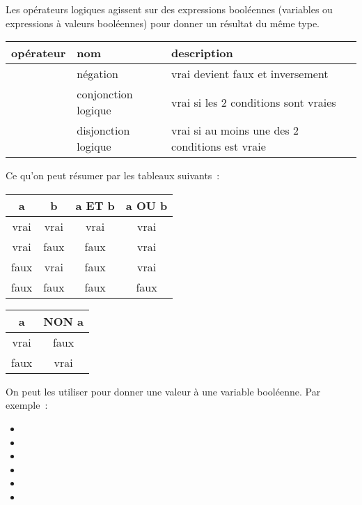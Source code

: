 			Les opérateurs logiques agissent sur des expressions booléennes 
			(variables ou expressions à valeurs booléennes) 
			pour donner un résultat du même type.
	
			\begin{center}
			\begin{tabular}{m{15mm}|m{3cm}|m{8cm}}
			opérateur & nom & description \\
			\hline
			\raggedleft \lda{NON} & négation & vrai devient faux et inversement\\
			\raggedleft \lda{ET} & conjonction logique & vrai si les 2 conditions sont vraies\\
			\raggedleft \lda{OU} & disjonction logique & vrai si au moins une des 2 conditions est vraie\\
			\hline
			\end{tabular}
			\end{center}
			\medskip
			
			Ce qu’on peut résumer par les tableaux suivants~:
			
			\begin{center}
			\begin{tabular}{|cccc|}
				\hline
				a & b & a ET b & a OU b \\
				\hline
				vrai & vrai & vrai & vrai \\\hline
				vrai & faux & faux & vrai \\\hline
				faux & vrai & faux & vrai \\\hline
				faux & faux & faux & faux \\\hline				
			\end{tabular}
			\qquad
			\begin{tabular}{|cc|}
				\hline
				a & NON a \\
				\hline
				vrai & faux \\\hline
				faux & vrai \\\hline
			\end{tabular}
			\end{center}

			On peut les utiliser 
			pour donner une valeur à une variable booléenne.
			Par exemple~:
			
			\begin{small}
			\begin{multicols}{2}
				\begin{itemize}
					\item {}
					\item {}
					\item {}
					\item {}
					\item {}
					\item {}
				\end{itemize}
			\end{multicols}
			\end{small}
	
